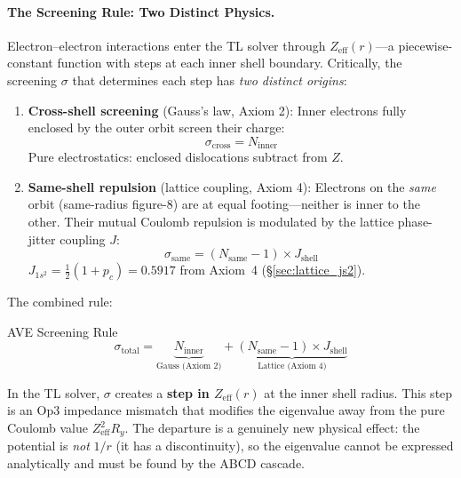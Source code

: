 \paragraph{The Screening Rule: Two Distinct Physics.}
Electron--electron interactions enter the TL solver through $Z_{\text{eff}}(r)$---a
piecewise-constant function with steps at each inner shell boundary.
Critically, the screening $\sigma$ that determines each step has \emph{two distinct origins}:

\begin{enumerate}
    \item \textbf{Cross-shell screening} (Gauss's law, Axiom 2):
    Inner electrons fully enclosed by the outer orbit screen their charge:
    \begin{equation}
        \sigma_{\text{cross}} = N_{\text{inner}}
    \end{equation}
    Pure electrostatics: enclosed dislocations subtract from $Z$.

    \item \textbf{Same-shell repulsion} (lattice coupling, Axiom 4):
    Electrons on the \emph{same} orbit (same-radius figure-8) are at equal footing---neither
    is inner to the other.  Their mutual Coulomb repulsion is modulated by the lattice
    phase-jitter coupling $J$:
    \begin{equation}
        \sigma_{\text{same}} = (N_{\text{same}} - 1) \times J_{\text{shell}}
    \end{equation}
    $J_{1s^2} = \tfrac{1}{2}(1 + p_c) = 0.5917$ from Axiom~4 (§\ref{sec:lattice_js2}).
\end{enumerate}

The combined rule:
\begin{resultbox}{AVE Screening Rule}
\begin{equation}
    \sigma_{\text{total}} = \underbrace{N_{\text{inner}}}_{\text{Gauss (Axiom 2)}}
    + \underbrace{(N_{\text{same}} - 1) \times J_{\text{shell}}}_{\text{Lattice (Axiom 4)}}
    \label{eq:screening_rule}
\end{equation}
\end{resultbox}

In the TL solver, $\sigma$ creates a \textbf{step in $Z_{\text{eff}}(r)$} at the inner
shell radius.  This step is an Op3 impedance mismatch that modifies the eigenvalue
away from the pure Coulomb value $Z_{\text{eff}}^2 R_y$.
The departure is a genuinely new physical effect: the potential is \emph{not} $1/r$
(it has a discontinuity), so the eigenvalue cannot be expressed analytically
and must be found by the ABCD cascade.

